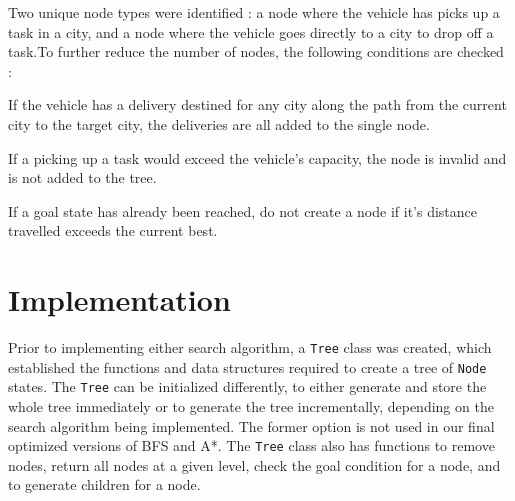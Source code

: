 \documentclass[11pt]{article}
\begin{document}
Two unique node types were identified : a node where the vehicle has picks up a task in a city, and a node where the vehicle goes directly to a city to drop off a task.To further reduce the number of nodes, the following conditions are checked :

\begin{compactenum}
	\item If the vehicle has a delivery destined for any city along the path from the current city to the target city, the deliveries are all added to the single node.
	\item If a picking up a task would exceed the vehicle's capacity, the node is invalid and is not added to the tree.
	\item If a goal state has already been reached, do not create a node if it's distance travelled exceeds the current best. 
\end{compactenum}

\section{Implementation}
Prior to implementing either search algorithm, a \texttt{Tree} class was created, which established the functions and data structures required to create a tree of \texttt{Node} states. The \texttt{Tree} can be initialized differently, to either generate and store the whole tree immediately or to generate the tree incrementally, depending on the search algorithm being implemented. The former option is not used in our final optimized versions of BFS and A*. The \texttt{Tree} class also has functions to remove nodes, return all nodes at a given level, check the goal condition for a node, and to generate children for a node. 
\end{document}
